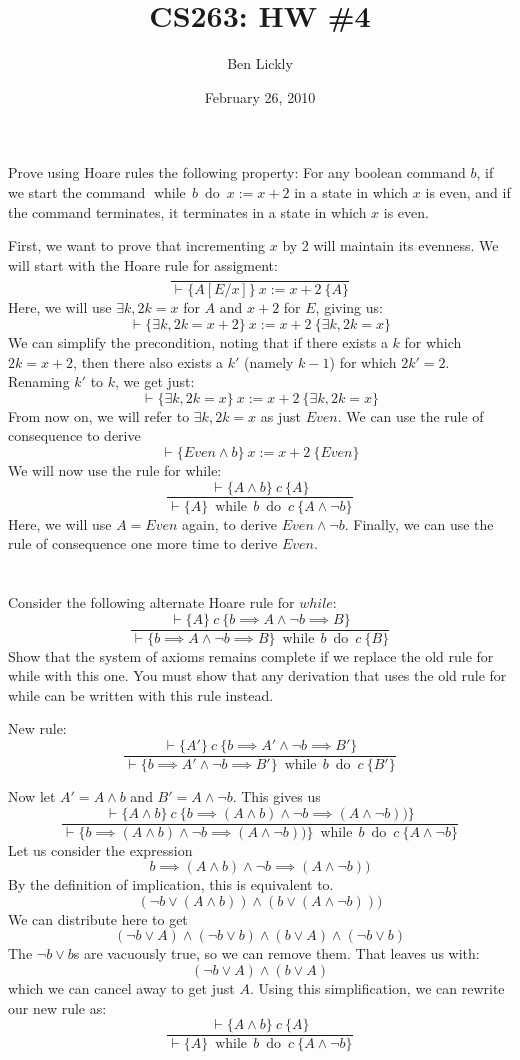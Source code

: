 \documentclass{article}
\title{CS263: HW \#4}
\author{Ben Lickly}
\date{February 26, 2010}
\newcommand{\problem}[1]
{\subsubsection*{} %
\vspace{-16pt} \section{} \vspace{-22pt} \qquad
#1%
\bigskip \bigskip
}
\newcommand{\while}[2]{\operatorname{while}\, #1\ \operatorname{do}\ #2}
\newcommand{\proves}{\vdash}
\newcommand{\axiomatic}[3]{\{#1\}\ #2\ \{#3\}}
\begin{document}
\maketitle

\problem{
Prove using Hoare rules the following property: For any boolean
command $b$, if we start the command $\while{b}{x := x + 2}$ in a state in
which $x$ is even, and if the command terminates, it terminates in a state in
which $x$ is even.
}
First, we want to prove that incrementing $x$ by 2 will maintain its evenness.
We will start with the Hoare rule for assigment:
\[
\frac{ }
{\proves \axiomatic{A[E/x]}{x := x + 2}{A}}
\]
Here, we will use $\exists k, 2k = x$ for $A$
and $x+2$ for $E$, giving us:
\[
\proves \axiomatic{\exists k, 2k = x + 2}{x := x + 2}{\exists k, 2k = x}
\]
We can simplify the precondition, noting that if there exists a $k$ for which
$2k = x +2$, then there also exists a $k'$ (namely $k-1$) for which $2k' = 2$.
Renaming $k'$ to $k$, we get just:
\[
\proves \axiomatic{\exists k, 2k = x}{x := x + 2}{\exists k, 2k = x}
\]
From now on, we will refer to $\exists k, 2k = x$ as just $Even$.
We can use the rule of consequence to derive
\[
\proves \axiomatic{Even \wedge b}{x := x + 2}{Even}
\]
We will now use the rule for while:
\[
\frac{\proves \axiomatic{A \wedge b}{c}{A}}
{\proves \axiomatic{A}{\while{b}{c}}{A \wedge \neg b}}
\]
Here, we will use $A = Even$ again, to derive $Even \wedge \neg b$.
Finally, we can use the rule of consequence one more time to derive $Even$.

\problem{Consider the following alternate Hoare rule for $while$:
\[
\frac{\proves \axiomatic{A}{c}{b \implies A \wedge \neg b \implies B}}
{\proves \axiomatic{b \implies A \wedge \neg b \implies B}{\while{b}{c}}{B}}
\]
    Show that the system of axioms remains complete if we replace the old
rule for while with this one. You must show that any derivation that uses
the old rule for while can be written with this rule instead.
}

New rule:
\[
\frac{\proves \axiomatic{A'}{c}{b \implies A' \wedge \neg b \implies B'}}
{\proves \axiomatic{b \implies A' \wedge \neg b \implies B'}{\while{b}{c}}{B'}}
\]

Now let $A' = A \wedge b$ and $B' = A \wedge \neg b$.
This gives us
\[
\frac{\proves \axiomatic {A \wedge b} {c}
  {b \implies (A \wedge b) \wedge \neg b \implies (A \wedge \neg b))}}
{\proves \axiomatic
  {b \implies (A \wedge b) \wedge \neg b \implies (A \wedge \neg b))}
  {\while{b}{c}} {A \wedge \neg b}}
\]
Let us consider the expression 
\[
b \implies (A \wedge b) \wedge \neg b \implies (A \wedge \neg b))
\]
By the definition of implication, this is equivalent to.
\[
(\neg b \vee (A \wedge b)) \wedge (b \vee (A \wedge \neg b)))
\]
We can distribute here to get
\[
(\neg b \vee A) \wedge (\neg b \vee b) \wedge (b \vee A) \wedge (\neg b \vee b)
\]
The $\neg b \vee b$s are vacuously true, so we can remove them.  That leaves us
with:
\[
(\neg b \vee A) \wedge (b \vee A)
\]
which we can cancel away to get just $A$.  Using this simplification, we can
rewrite our new rule as:
\[
\frac{\proves \axiomatic{A \wedge b}{c}{A}}
{\proves \axiomatic{A}{\while{b}{c}}{A \wedge \neg b}}
\]
\end{document}
